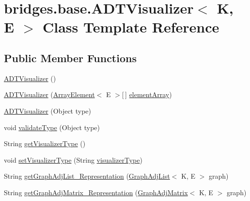 \hypertarget{classbridges_1_1base_1_1_a_d_t_visualizer}{}\section{bridges.\+base.\+A\+D\+T\+Visualizer$<$ K, E $>$ Class Template Reference}
\label{classbridges_1_1base_1_1_a_d_t_visualizer}
\subsection*{Public Member Functions}
\begin{DoxyCompactItemize}
\item 
\hyperlink{classbridges_1_1base_1_1_a_d_t_visualizer_a3d5098e4c0609c19a547f19f0d538eeb}{A\+D\+T\+Visualizer} ()
\item 
\hyperlink{classbridges_1_1base_1_1_a_d_t_visualizer_acd2d6c0459173578f4fd95ac4d05cd10}{A\+D\+T\+Visualizer} (\hyperlink{classbridges_1_1base_1_1_array_element}{Array\+Element}$<$ E $>$\mbox{[}$\,$\mbox{]} \hyperlink{classbridges_1_1base_1_1_a_d_t_visualizer_a320739b4be463d3987b3de2463b0d592}{element\+Array})
\item 
\hyperlink{classbridges_1_1base_1_1_a_d_t_visualizer_af722d7ea9506b1ca8119ae39c43130ff}{A\+D\+T\+Visualizer} (Object type)
\item 
void \hyperlink{classbridges_1_1base_1_1_a_d_t_visualizer_a991fc08ab102bc0f861e0aefe75282e7}{validate\+Type} (Object type)
\item 
String \hyperlink{classbridges_1_1base_1_1_a_d_t_visualizer_aea37161ff4b74fbeae6f478b4c2e1a50}{get\+Visualizer\+Type} ()
\item 
void \hyperlink{classbridges_1_1base_1_1_a_d_t_visualizer_a5f423ff4295f3ae4371c86d4ab45638c}{set\+Visualizer\+Type} (String \hyperlink{classbridges_1_1base_1_1_a_d_t_visualizer_a288aece657b5641f48e839b34f3884b9}{visualizer\+Type})
\item 
String \hyperlink{classbridges_1_1base_1_1_a_d_t_visualizer_a0b923e3a1afd3d56b5c42ef39e4c5542}{get\+Graph\+Adj\+List\+\_\+\+Representation} (\hyperlink{classbridges_1_1base_1_1_graph_adj_list}{Graph\+Adj\+List}$<$ K, E $>$ graph)
\item 
String \hyperlink{classbridges_1_1base_1_1_a_d_t_visualizer_a7e3ecfc9522596bd12f0adef694eacf2}{get\+Graph\+Adj\+Matrix\+\_\+\+Representation} (\hyperlink{classbridges_1_1base_1_1_graph_adj_matrix}{Graph\+Adj\+Matrix}$<$ K, E $>$ graph)
\item 

\end{DoxyCompactItemize}
